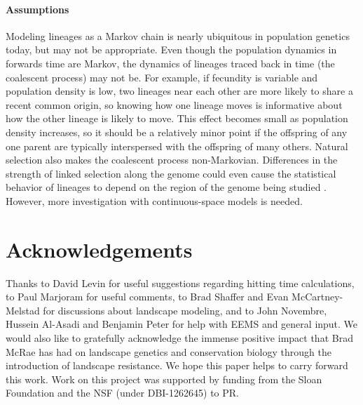 \documentclass{article}
\newif\ifsubmission
\begin{document}
\paragraph{Assumptions}
Modeling lineages as a Markov chain is nearly ubiquitous in population genetics today,
but may not be appropriate.
Even though the population dynamics in forwards time are Markov, 
the dynamics of lineages traced back in time (the coalescent process) may not be. 
For example, if fecundity is variable and population density is low,  
two lineages near each other are more likely to share a recent common origin, 
so knowing how one lineage moves is informative about how the other lineage is likely to move. 
This effect becomes small as population density increases, 
so it should be a relatively minor point if the offspring
of any one parent are typically interspersed with the offspring of many others. 
Natural selection also makes the coalescent process non-Markovian.
Differences in the strength of linked selection along the genome
could even cause the statistical behavior of lineages to depend
on the region of the genome being studied \citep{wang2014isolation,li2016local}.
However, more investigation with continuous-space models is needed.



\section*{Acknowledgements}

Thanks to David Levin for useful suggestions regarding hitting time calculations,
to Paul Marjoram for useful comments,
to Brad Shaffer and Evan McCartney-Melstad for discussions about landscape modeling,
and to John Novembre, Hussein Al-Asadi and Benjamin Peter for help with EEMS
and general input.
We would also like to gratefully acknowledge the immense positive impact that Brad McRae \citep[1966--2017;][]{lawler2018tribute}
has had on landscape genetics and conservation biology through the introduction of landscape resistance.
We hope this paper helps to carry forward this work.
Work on this project was supported by funding from
the Sloan Foundation and the NSF (under DBI-1262645) to PR.




\ifsubmission
\processdelayedfloats
\fi

\newpage


\appendix
\renewcommand{\thefigure}{S\arabic{figure}}
\setcounter{figure}{0}
\ifsubmission
    \renewcommand{\thepostfigure}{S\arabic{postfigure}}
    \setcounter{postfigure}{0}
\fi
\end{document}
